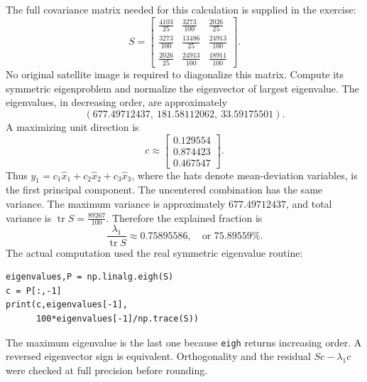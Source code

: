 The full covariance matrix needed for this calculation is supplied in the exercise:
\[S=\begin{bmatrix}\frac{4103}{25}&\frac{3273}{100}&\frac{2026}{25}\\\frac{3273}{100}&\frac{13486}{25}&\frac{24913}{100}\\\frac{2026}{25}&\frac{24913}{100}&\frac{18911}{100}\end{bmatrix}.\]
No original satellite image is required to diagonalize this matrix. Compute its symmetric eigenproblem and normalize the eigenvector of largest eigenvalue. The eigenvalues, in decreasing order, are approximately
\[(677.49712437,\ 181.58112062,\ 33.59175501).\]
A maximizing unit direction is
\[c\approx\begin{bmatrix}0.129554\\0.874423\\0.467547\end{bmatrix}.\]
Thus $y_1=c_1\widehat x_1+c_2\widehat x_2+c_3\widehat x_3$, where the hats denote mean-deviation variables, is the first principal component. The uncentered combination has the same variance. The maximum variance is approximately $677.49712437$, and total variance is $\operatorname{tr}S=\frac{89267}{100}$. Therefore the explained fraction is
\[\frac{\lambda_1}{\operatorname{tr}S}\approx 0.75895586,\quad\text{or }75.89559\%.\]
The actual computation used the real symmetric eigenvalue routine:
\begin{verbatim}
eigenvalues,P = np.linalg.eigh(S)
c = P[:,-1]
print(c,eigenvalues[-1],
      100*eigenvalues[-1]/np.trace(S))
\end{verbatim}
The maximum eigenvalue is the last one because \texttt{eigh} returns increasing order. A reversed eigenvector sign is equivalent. Orthogonality and the residual $Sc-\lambda_1c$ were checked at full precision before rounding.

